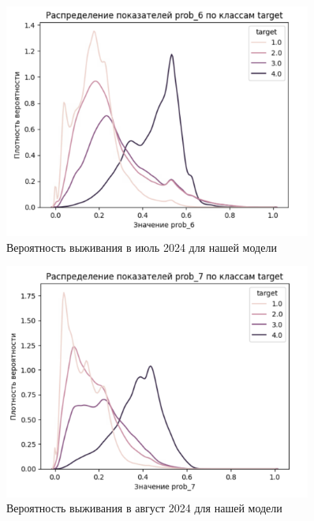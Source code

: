 \documentclass[a4paper,14pt,oneside,openany]{memoir}
\begin{document}
\begin{figure}[H]
	\includegraphics[width=0.9\textwidth]{../figures/prob_6_ours.png}
	\caption{Вероятность выживания в июль 2024 для нашей модели}
\end{figure}

\begin{figure}[H]
	\includegraphics[width=0.9\textwidth]{../figures/prob_7_ours.png}
	\caption{Вероятность выживания в август 2024 для нашей модели}
\end{figure}
\end{document}
